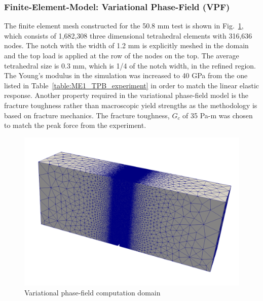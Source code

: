 \subsubsection*{Finite-Element-Model: Variational Phase-Field (VPF)}

The finite element mesh constructed for the 50.8 mm test is shown in Fig.~\ref{fig:ME1_TPB_VF_domain}, which consists of 1,682,308 three dimensional tetrahedral elements with 316,636 nodes.
The notch with the width of 1.2 mm is explicitly meshed in the domain and the top load is applied at the row of the nodes on the top.
The average tetrahedral size is 0.3 mm, which is 1/4 of the notch width, in the refined region.
The Young's modulus in the simulation was increased to 40 GPa from the one listed in Table~\ref{table:ME1_TPB_experiment} in order to match the linear elastic response. 
Another property required in the variational phase-field model is the fracture toughness rather than macroscopic yield strengths as the methodology is based on fracture mechanics.
The fracture toughness, $G_c$ of 35 Pa-m was chosen to match the peak force from the experiment.

\begin{figure}[!ht]
\centering
\includegraphics[width=1\textwidth]{figures/VPF_model_domain_mesh.png}
\caption{Variational phase-field computation domain}
\label{fig:ME1_TPB_VF_domain}
\end{figure}

